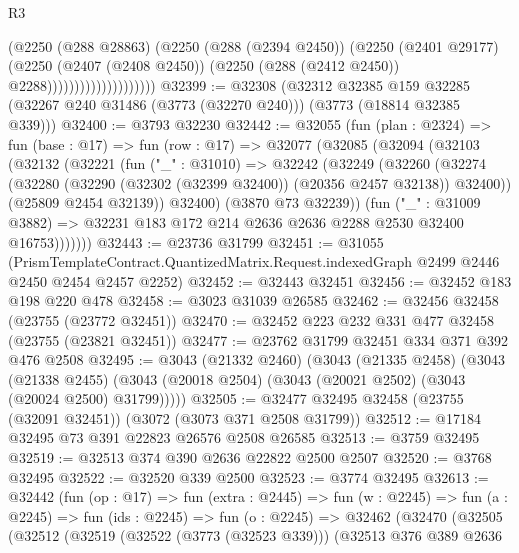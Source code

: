 \begin{lexlean}{R3}
\begin{coremodule}
                                  (@2250
                                    (@288 @28863)
                                    (@2250
                                      (@288 (@2394 @2450))
                                      (@2250
                                        (@2401 @29177)
                                        (@2250
                                          (@2407 (@2408 @2450))
                                          (@2250 (@288 (@2412 @2450)) @2288))))))))))))))))))))
@32399 := @32308
    (@32312
      @32385
      @159
      @32285
      (@32267 @240 @31486 (@3773 (@32270 @240)))
      (@3773 (@18814 @32385 @339)))
@32400 := @3793 @32230
@32442 := @32055
    (fun (plan : @2324) =>
    fun (base : @17) =>
    fun (row : @17) =>
    @32077
      (@32085
        (@32094
          (@32103
            (@32132
              (@32221
                (fun ("_" : @31010) =>
                @32242
                  (@32249
                    (@32260
                      (@32274
                        (@32280 (@32290 (@32302 (@32399 @32400)) (@20356 @2457 @32138)) @32400))
                      (@25809 @2454 @32139))
                    @32400)
                  (@3870 @73 @32239))
                (fun ("_" : @31009 @3882) =>
                @32231 @183 @172 @214 @2636 @2636 @2288 @2530 @32400 @16753)))))))
@32443 := @23736 @31799
@32451 := @31055
    (PrismTemplateContract.QuantizedMatrix.Request.indexedGraph @2499 @2446 @2450 @2454 @2457 @2252)
@32452 := @32443 @32451
@32456 := @32452 @183 @198 @220 @478
@32458 := @3023 @31039 @26585
@32462 := @32456 @32458 (@23755 (@23772 @32451))
@32470 := @32452 @223 @232 @331 @477 @32458 (@23755 (@23821 @32451))
@32477 := @23762 @31799 @32451 @334 @371 @392 @476 @2508
@32495 := @3043
    (@21332 @2460)
    (@3043
      (@21335 @2458)
      (@3043
        (@21338 @2455)
        (@3043 (@20018 @2504) (@3043 (@20021 @2502) (@3043 (@20024 @2500) @31799)))))
@32505 := @32477 @32495 @32458 (@23755 (@32091 @32451)) (@3072 (@3073 @371 @2508 @31799))
@32512 := @17184 @32495 @73 @391 @22823 @26576 @2508 @26585
@32513 := @3759 @32495
@32519 := @32513 @374 @390 @2636 @22822 @2500 @2507
@32520 := @3768 @32495
@32522 := @32520 @339 @2500
@32523 := @3774 @32495
@32613 := @32442
    (fun (op : @17) =>
    fun (extra : @2445) =>
    fun (w : @2245) =>
    fun (a : @2245) =>
    fun (ids : @2245) =>
    fun (o : @2245) =>
    @32462
      (@32470
        (@32505
          (@32512
            (@32519
              (@32522 (@3773 (@32523 @339)))
              (@32513
                @376
                @389
                @2636

\end{coremodule}
\end{lexlean}
